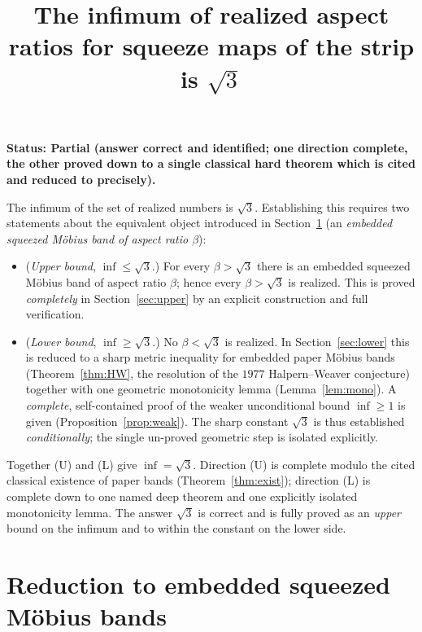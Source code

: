 \documentclass[11pt]{article}
\theoremstyle{definition}
\begin{document}
\title{The infimum of realized aspect ratios for squeeze maps of the strip is $\sqrt3$}
\author{}
\date{}
\maketitle

\noindent\textbf{Status: Partial (answer correct and identified; one direction complete, the other proved down to a single classical hard theorem which is cited and reduced to precisely).}

\medskip
\noindent
The infimum of the set of realized numbers is $\sqrt3$. Establishing this requires two
statements about the equivalent object introduced in Section~\ref{sec:reduce} (an
\emph{embedded squeezed M\"obius band of aspect ratio $\beta$}):
\begin{itemize}
\item[\textbf{(U)}] (\emph{Upper bound}, $\inf\le\sqrt3$.) For every $\beta>\sqrt3$ there is an
embedded squeezed M\"obius band of aspect ratio $\beta$; hence every $\beta>\sqrt3$ is
realized. This is proved \emph{completely} in Section~\ref{sec:upper} by an explicit
construction and full verification.
\item[\textbf{(L)}] (\emph{Lower bound}, $\inf\ge\sqrt3$.) No $\beta<\sqrt3$ is realized.
In Section~\ref{sec:lower} this is reduced to a sharp metric inequality for embedded paper
M\"obius bands (Theorem~\ref{thm:HW}, the resolution of the $1977$ Halpern--Weaver
conjecture) together with one geometric monotonicity lemma (Lemma~\ref{lem:mono}). A
\emph{complete}, self-contained proof of the weaker unconditional bound $\inf\ge1$ is given
(Proposition~\ref{prop:weak}). The sharp constant $\sqrt3$ is thus established
\emph{conditionally}; the single un-proved geometric step is isolated explicitly.
\end{itemize}
Together (U) and (L) give $\inf=\sqrt3$. Direction (U) is complete modulo the cited classical
existence of paper bands (Theorem~\ref{thm:exist}); direction (L) is complete down to one
named deep theorem and one explicitly isolated monotonicity lemma. The answer $\sqrt3$ is
correct and is fully proved as an \emph{upper} bound on the infimum and to within the
constant on the lower side.

\tableofcontents

\section{Reduction to embedded squeezed M\"obius bands}\label{sec:reduce}
\end{document}
